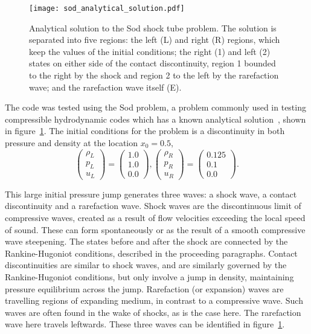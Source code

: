 \begin{figure}[t]
  \centering
  \texttt{[image: sod\_analytical\_solution.pdf]}
  \caption{Analytical solution to the Sod shock tube problem. The solution is separated into five regions: the left (L) and right (R) regions, which keep the values of the initial conditions; the right (1) and left (2) states on either side of the contact discontinuity, region 1 bounded to the right by the shock and region 2 to the left by the rarefaction wave; and the rarefaction wave itself (E).}%
  \label{fig:sod_analytical_solution}
\end{figure}

The code was tested using the Sod problem, a problem commonly used in testing compressible hydrodynamic codes which has a known analytical solution~\cite{sodSurveySeveralFinite1978}, shown in figure~\ref{fig:sod_analytical_solution}. The initial conditions for the problem is a discontinuity in both pressure and density at the location $x_0=0.5$,
\begin{equation}
  \label{eq:sod_problem_ic}
\begin{pmatrix}\rho _{L}\\p_{L}\\u_{L}\end{pmatrix}
=
\begin{pmatrix}1.0\\1.0\\0.0\end{pmatrix},
\begin{pmatrix}\rho _{R}\\p_{R}\\u_{R}\end{pmatrix}
=
\begin{pmatrix}0.125\\0.1\\0.0\end{pmatrix}.
\end{equation}

This large initial pressure jump generates three waves: a shock wave, a contact discontinuity and a rarefaction wave. Shock waves are the discontinuous limit of compressive waves, created as a result of flow velocities exceeding the local speed of sound. These can form spontaneously or as the result of a smooth compressive wave steepening. The states before and after the shock are connected by the Rankine-Hugoniot conditions, described in the proceeding paragraphs. Contact discontinuities are similar to shock waves, and are similarly governed by the Rankine-Hugoniot conditions, but only involve a jump in density, maintaining pressure equilibrium across the jump. Rarefaction (or expansion) waves are travelling regions of expanding medium, in contrast to a compressive wave. Such waves are often found in the wake of shocks, as is the case here. The rarefaction wave here travels leftwards. These three waves can be identified in figure~\ref{fig:sod_analytical_solution}.

